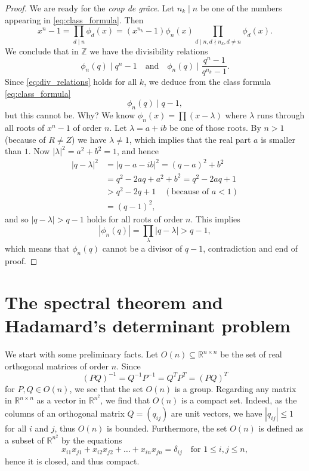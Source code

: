 \begin{proof}
  We are ready for the \emph{coup de gr\^ace}.
  Let $n_k \mid n$ be one of the numbers appearing in \eqref{eq:class_formula}.
  Then
  \[
  x^n - 1 = \prod_{d \mid n} \phi_d(x) = (x^{n_k} - 1) \phi_n(x) \prod_{d \mid n, d \nmid n_k, d \ne n} \phi_d(x).
  \]
  We conclude that in $\mathbb{Z}$ we have the divisibility relations
  \begin{equation} \label{eq:div_relations}
  \phi_n(q) \mid q^n - 1 \quad \text{and} \quad \phi_n(q) \mid \frac{q^n - 1}{q^{n_k} - 1}.
  \end{equation}
  Since \eqref{eq:div_relations} holds for all $k$, we deduce from the class formula \eqref{eq:class_formula}
  \[
  \phi_n(q) \mid q - 1,
  \]
  but this cannot be.
  Why? We know $\phi_n(x) = \prod (x - \lambda)$ where $\lambda$ runs through all roots of $x^n - 1$ of order $n$.
  Let $\lambda = a + ib$ be one of those roots.
  By $n > 1$ (because of $R \ne Z$) we have $\lambda \ne 1$, which implies that the real part $a$ is smaller than $1$.
  Now $|\lambda|^2 = a^2 + b^2 = 1$, and hence
  \begin{align*}
  |q - \lambda|^2 &= |q - a - ib|^2 = (q - a)^2 + b^2 \\
  &= q^2 - 2aq + a^2 + b^2 = q^2 - 2aq + 1 \\
  &> q^2 - 2q + 1 \quad (\text{because of } a < 1) \\
  &= (q - 1)^2,
  \end{align*}
  and so $|q - \lambda| > q - 1$ holds for all roots of order $n$.
  This implies
  \[
  |\phi_n(q)| = \prod_{\lambda} |q - \lambda| > q - 1,
  \]
  which means that $\phi_n(q)$ cannot be a divisor of $q - 1$, contradiction and end of proof.
\end{proof}


\chapter{The spectral theorem and Hadamard's determinant problem}

We start with some preliminary facts. Let $O(n) \subseteq \mathbb{R}^{n \times n}$ be the set of real orthogonal matrices of order $n$. Since
\[
(PQ)^{-1} = Q^{-1} P^{-1} = Q^T P^T = (PQ)^T
\]
for $P, Q \in O(n)$, we see that the set $O(n)$ is a group. Regarding any matrix in $\mathbb{R}^{n \times n}$ as a vector in $\mathbb{R}^{n^2}$, we find that $O(n)$ is a compact set. Indeed, as the columns of an orthogonal matrix $Q = (q_{ij})$ are unit vectors, we have $|q_{ij}| \le 1$ for all $i$ and $j$, thus $O(n)$ is bounded. Furthermore, the set $O(n)$ is defined as a subset of $\mathbb{R}^{n^2}$ by the equations
\[
x_{i1} x_{j1} + x_{i2} x_{j2} + \dots + x_{in} x_{jn} = \delta_{ij} \quad \text{for } 1 \le i, j \le n,
\]
hence it is closed, and thus compact.

